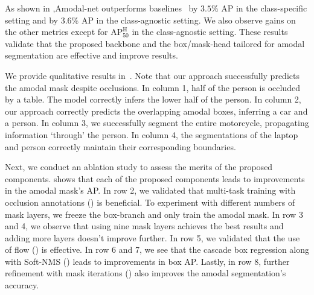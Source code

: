 As shown in ,Amodal-net outperforms baselines~\cite{hu2019sail} by $3.5\%$ AP in the class-specific setting and by $3.6\%$ %
AP in the class-agnostic setting. We also observe gains on the other metrics except for $\text{AP}_{\text{50}}^{\text{H}}$ in the class-agnostic setting. These results validate that the proposed backbone and the box/mask-head tailored for amodal segmentation are effective and improve results.


We provide qualitative results in~. Note that our approach successfully predicts the amodal mask despite occlusions. 
In column 1, half of the person is occluded by a table. The model correctly infers the lower half of the person. In column 2, our approach correctly predicts the overlapping amodal boxes, inferring a car and a person.
In column 3, we successfully segment  the entire motorcycle, propagating information `through' the person.
In column 4, the segmentations of the laptop and person correctly maintain their corresponding boundaries.   



Next, we conduct an ablation study to assess the merits of the proposed components.   shows that each of the proposed components leads to improvements in the amodal mask's AP.
In row 2, we validated that multi-task training with occlusion annotations () is beneficial. 
To experiment with different numbers of mask layers, we freeze the box-branch and only train the amodal mask.
In row 3 and 4, we observe that using nine mask layers achieves the best results and adding more layers doesn't improve further. In row 5, we validated that the use of flow () is effective. 
In row 6 and 7, we see that the cascade box regression along with Soft-NMS () leads to improvements in box AP. Lastly, in row 8, further refinement with mask iterations () also improves the amodal segmentation's accuracy.





